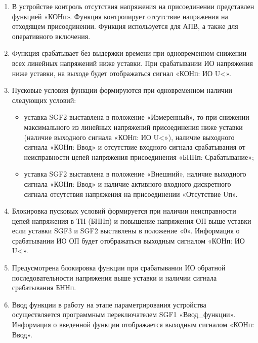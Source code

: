 
\color{black}

\begin{enumerate}

\item
В устройстве контроль отсутствия напряжения на присоединении представлен функцией «КОНп». Функция контролирует отсутствие напряжения на отходящем присоединении. Функция используется для АПВ, а также для оперативного включения. 

\item
Функция срабатывает без выдержки времени при одновременном снижении всех линейных напряжений ниже уставки. При срабатывании ИО напряжения ниже уставки, на выходе будет отображаться сигнал «КОНп: ИО U<».

\item
Пусковые условия функции формируются при одновременном наличии следующих условий:
\begin{itemize}
    \item уставка SGF2 выставлена в положение «Измеренный», то при снижении максимального из линейных напряжений присоединения ниже уставки (наличие выходного сигнала «КОНп: ИО U<»), наличие выходного сигнала «КОНп: Ввод» и отсутствие входного сигнала срабатывания от неисправности цепей напряжения присоединения «БННп: Срабатывание»;
    \item уставка SGF2 выставлена в положение «Внешний», наличие выходного сигнала «КОНп: Ввод» и наличие активного входного дискретного сигнала отсутствия напряжения на присоединении «Отсутствие Uп».
\end{itemize}

\item
Блокировка пусковых условий формируется при наличии неисправности цепей напряжения в ТН (БННп) и повышение напряжения ОП выше уставки если уставки SGF3 и SGF2 выставлены в положение «0». Информация о срабатывании ИО ОП будет отображаться выходным сигналом «КОНп: ИО U<».

\item
Предусмотрена блокировка функции при срабатывании ИО обратной последовательности напряжения выше уставки и наличии сигнала срабатывания БННп.

\item
Ввод функции в работу на этапе параметрирования устройства осуществляется программным переключателем SGF1 «Ввод\_функции». Информация о введенной функции отображается выходным сигналом «КОНп: Ввод».


\end{enumerate}
